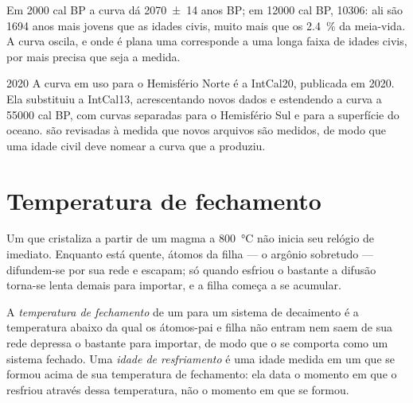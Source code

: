 Em \num{2000} cal BP a curva dá \num[uncertainty-mode=separate]{2070 \pm 14} anos BP; em
\num{12000} cal BP, \num{10306}:  ali são \num{1694} anos mais jovens que as
idades civis, muito mais que os \qty{2.4}{\percent} da meia-vida. A curva oscila, e onde é plana
uma  corresponde a uma longa faixa de idades civis, por mais precisa que seja a
medida.

\begin{dated}{2020}
A curva em uso para o Hemisfério Norte é a IntCal20, publicada em 2020. Ela substituiu a
IntCal13, acrescentando novos dados e estendendo a curva a \num{55000} cal BP, com curvas
separadas para o Hemisfério Sul e para a superfície do oceano.  são revisadas
à medida que novos arquivos são medidos, de modo que uma idade civil deve nomear a curva que a
produziu.
\end{dated}

\section{Temperatura de fechamento}\label{sec:b1:radiometric-methods:closure}

Um  que cristaliza a partir de um magma a \qty{800}{\celsius} não inicia seu relógio de
imediato. Enquanto está quente, átomos da filha --- o argônio sobretudo --- difundem-se por sua
rede e escapam; só quando esfriou o bastante a difusão torna-se lenta demais para importar, e a
filha começa a se acumular.

\begin{definition}\label{def:b1:radiometric-methods:closure}
A \emph{temperatura de fechamento} de um  para um sistema
de decaimento é a temperatura abaixo da qual os átomos-pai e filha não entram nem saem de sua
rede depressa o bastante para importar, de modo que o  se comporta como um sistema
fechado. Uma \emph{idade de resfriamento} é uma idade medida em um
 que se formou acima de sua temperatura de fechamento: ela data o momento em que o 
resfriou através dessa temperatura, não o momento em que se formou.
\end{definition}

